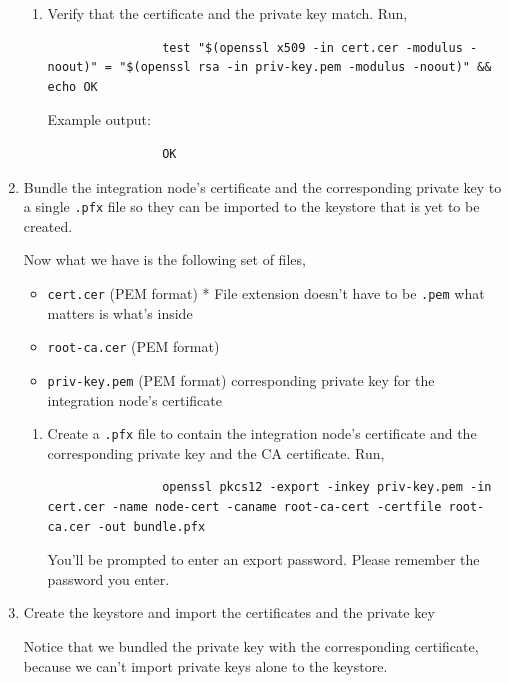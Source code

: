 \documentclass{article}
\begin{document}
\begin{enumerate}[itemsep=4ex]
\begin{enumerate}[itemsep=3ex]
            \item Verify that the certificate and the private key match. Run,
            \begin{lstlisting}
                test "$(openssl x509 -in cert.cer -modulus -noout)" = "$(openssl rsa -in priv-key.pem -modulus -noout)" && echo OK
            \end{lstlisting}
            Example output:
            \begin{lstlisting}
                OK
            \end{lstlisting}

        \end{enumerate}

        \item Bundle the integration node's certificate and the corresponding private key to a single \texttt{.pfx} file so they can be imported to the keystore that is yet to be created.

        Now what we have is the following set of files,
        \begin{itemize}
            \item \texttt{cert.cer} (PEM format) * File extension doesn't have to be \texttt{.pem} what matters is what's inside
            \item \texttt{root-ca.cer} (PEM format)
            \item \texttt{priv-key.pem} (PEM format) corresponding private key for the integration node's certificate
        \end{itemize}

        \begin{enumerate}
            \item Create a \texttt{.pfx} file to contain the integration node's certificate and the corresponding private key and the CA certificate. Run,
            \begin{lstlisting}
                openssl pkcs12 -export -inkey priv-key.pem -in cert.cer -name node-cert -caname root-ca-cert -certfile root-ca.cer -out bundle.pfx
            \end{lstlisting}
            You'll be prompted to enter an export password. Please remember the password you enter.
        \end{enumerate}

        \item Create the keystore and import the certificates and the private key

        Notice that we bundled the private key with the corresponding certificate, because we can't import private keys alone to the keystore.
        

\end{enumerate}
\end{document}
